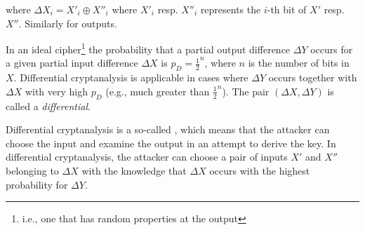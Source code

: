 where $\Delta X_i = X'_i \oplus X''_i$ where $X'_i$ resp. $X''_i$ represents the $i$-th bit of $X'$ resp. $X''$.
Similarly for outputs.

In an ideal cipher\footnote{i.e., one that has random properties at the output}
the probability that a partial output difference $\Delta Y$ occurs
for a given partial input difference $\Delta X$ is $p_D = \frac{1}{2}^n$, where $n$ is the number of bits in $X$.
Differential cryptanalysis is applicable in cases where $\Delta Y$
occurs together with $\Delta X$ with very high $p_D$ (e.g., much greater than
$\frac{1}{2}^n$). The pair $(\Delta X, \Delta Y)$ is called a \emph{differential}.

Differential cryptanalysis is a so-called ,
which means that the attacker can choose the input and examine the output in an attempt to derive the key.
In differential cryptanalysis, the attacker can choose a pair of inputs $X'$ and $X''$
belonging to $\Delta X$ with the knowledge that $\Delta X$ occurs with the highest probability
for $\Delta Y$.
